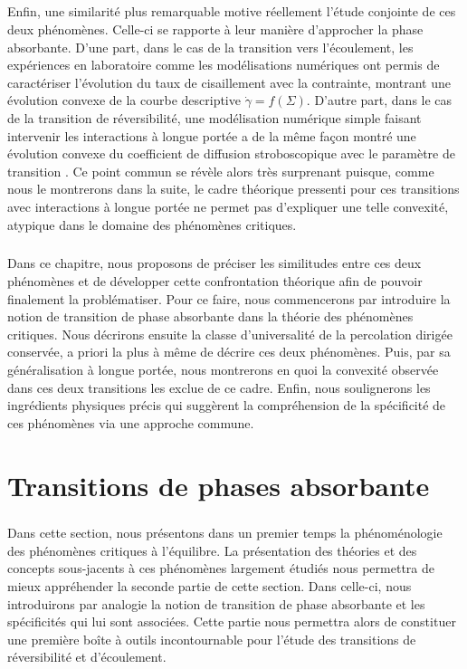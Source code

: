 \subparagraph{}Enfin, une similarité plus remarquable motive réellement l'étude conjointe de ces deux phénomènes. Celle-ci se rapporte à leur manière d'approcher la phase absorbante. D'une part, dans le cas de la transition vers l'écoulement, les expériences en laboratoire comme les modélisations numériques ont permis de caractériser l'évolution du taux de cisaillement avec la contrainte, montrant une évolution convexe de la courbe descriptive $\dot{\gamma} = f(\Sigma)$. D'autre part, dans le cas de la transition de réversibilité, une modélisation numérique simple faisant intervenir les interactions à longue portée a de la même façon montré une évolution convexe du coefficient de diffusion stroboscopique avec le paramètre de transition \cite{mari_absorbing_2022}. Ce point commun se révèle alors très surprenant puisque, comme nous le montrerons dans la suite, le cadre théorique pressenti pour ces transitions avec interactions à longue portée ne permet pas d'expliquer une telle convexité, atypique dans le domaine des phénomènes critiques. 

\subparagraph{}Dans ce chapitre, nous proposons de préciser les similitudes entre ces deux phénomènes et de développer cette confrontation théorique afin de pouvoir finalement la problématiser. Pour ce faire, nous commencerons par introduire la notion de transition de phase absorbante dans la théorie des phénomènes critiques. Nous décrirons ensuite la classe d'universalité de la percolation dirigée conservée, a priori la plus à même de décrire ces deux phénomènes. Puis, par sa généralisation à longue portée, nous montrerons en quoi la convexité observée dans ces deux transitions les exclue de ce cadre. Enfin, nous soulignerons les ingrédients physiques précis qui suggèrent la compréhension de la spécificité de ces phénomènes via une approche commune.

\section{Transitions de phases absorbante}

\subparagraph{}Dans cette section, nous présentons dans un premier temps la phénoménologie des phénomènes critiques à l'équilibre. La présentation des théories et des concepts sous-jacents à ces phénomènes largement étudiés nous permettra de mieux appréhender la seconde partie de cette section. Dans celle-ci, nous introduirons par analogie la notion de transition de phase absorbante et les spécificités qui lui sont associées. Cette partie nous permettra alors de constituer une première boîte à outils incontournable pour l'étude des transitions de réversibilité et d'écoulement.

